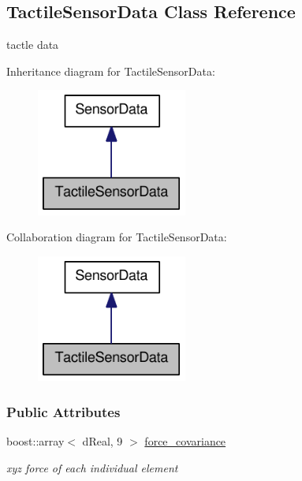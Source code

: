 \hypertarget{classOpenRAVE_1_1SensorBase_1_1TactileSensorData}{
\subsection{TactileSensorData Class Reference}
\label{classOpenRAVE_1_1SensorBase_1_1TactileSensorData}
}


tactle data  




Inheritance diagram for TactileSensorData:\nopagebreak
\begin{figure}[H]
\begin{center}
\leavevmode
\includegraphics[width=140pt]{classOpenRAVE_1_1SensorBase_1_1TactileSensorData__inherit__graph}
\end{center}
\end{figure}


Collaboration diagram for TactileSensorData:\nopagebreak
\begin{figure}[H]
\begin{center}
\leavevmode
\includegraphics[width=140pt]{classOpenRAVE_1_1SensorBase_1_1TactileSensorData__coll__graph}
\end{center}
\end{figure}
\subsubsection*{Public Attributes}
\begin{DoxyCompactItemize}
\item 
boost::array$<$ dReal, 9 $>$ \hyperlink{classOpenRAVE_1_1SensorBase_1_1TactileSensorData_a972c8980eeb77603fbda2827c16ae213}{force\_\-covariance}
\begin{DoxyCompactList}\small\item\em xyz force of each individual element \item\end{DoxyCompactList}\end{DoxyCompactItemize}


